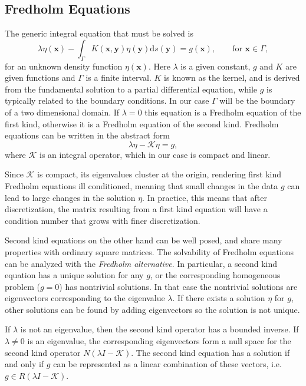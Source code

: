 \subsection{Fredholm Equations}

The generic integral equation that must be solved is
\begin{equation}\label{eq:fredholm} \lambda\eta(\mathbf{x}) - \int_{\Gamma} K(\mathbf{x},\mathbf{y})\eta(\mathbf{y})\text{d}s(\mathbf{y}) = g(\mathbf{x}), \qquad \text{for } \mathbf{x}\in\Gamma,\end{equation}
for an unknown density function $\eta(\mathbf{x})$. Here $\lambda$ is a given constant, $g$ and $K$ are given functions and $\Gamma$ is a finite interval. $K$ is known as the kernel, and is derived from the fundamental solution to a partial differential equation, while $g$ is typically related to the boundary conditions. In our case $\Gamma$ will be the boundary of a two dimensional domain. If $\lambda=0$ this equation is a Fredholm equation of the first kind, otherwise it is a Fredholm equation of the second kind. Fredholm equations can be written in the abstract form
\[ \lambda \eta - \mathcal{K}\eta = g,\]
where $\mathcal{K}$ is an integral operator, which in our case is compact and linear. 

Since $\mathcal{K}$ is compact, its eigenvalues cluster at the origin, rendering first kind Fredholm equations ill conditioned, meaning that small changes in the data $g$ can lead to large changes in the solution $\eta$. In practice, this means that after discretization, the matrix resulting from a first kind equation will have a condition number that grows with finer discretization.

Second kind equations on the other hand can be well posed, and share many properties with ordinary square matrices. The solvability of Fredholm equations can be analyzed with the \textit{Fredholm alternative}. In particular, a second kind equation has a unique solution for any $g$, or the corresponding homogeneous problem ($g=0$) has nontrivial solutions. In that case the nontrivial solutions are eigenvectors corresponding to the eigenvalue $\lambda$. If there exists a solution $\eta$ for $g$, other solutions can be found by adding eigenvectors so the solution is not unique. 

If $\lambda$ is not an eigenvalue, then the second kind operator has a bounded inverse. If $\lambda\ne 0$ is an eigenvalue, the corresponding eigenvectors form a null space for the second kind operator $N(\lambda I - \mathcal{K})$. The second kind equation has a solution if and only if $g$ can be represented as a linear combination of these vectors, i.e. $g\in R(\lambda I - \mathcal{K})$. 

